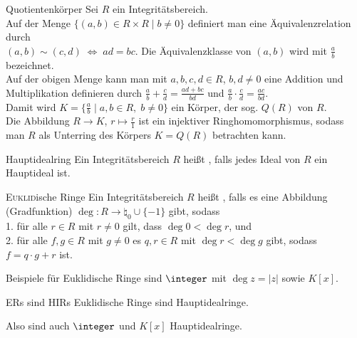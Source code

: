 \begin{Def}{Quotientenkörper}
    Sei $R$ ein Integritätsbereich. \\
    Auf der Menge $\{(a, b) \in R \times R \;|\; b \not= 0\}$ definiert
    man eine Äquivalenzrelation durch \\
    $(a, b) \sim (c, d) \;\Leftrightarrow\; ad = bc$.
    Die Äquivalenzklasse von $(a, b)$ wird mit $\frac{a}{b}$
    bezeichnet. \\
    Auf der obigen Menge kann man mit $a, b, c, d \in R$, $b, d \not= 0$
    eine Addition und Multiplikation definieren durch
    $\frac{a}{b} + \frac{c}{d} = \frac{ad + bc}{bd}$ und
    $\frac{a}{b} \cdot \frac{c}{d} = \frac{ac}{bd}$. \\
    Damit wird $K = \{\frac{a}{b} \;|\; a, b \in R,\; b \not= 0\}$ ein
    Körper, der sog.  $Q(R)$ von $R$. \\
    Die Abbildung $R \rightarrow K$, $r \mapsto \frac{r}{1}$ ist ein
    injektiver Ringhomomorphismus, sodass man $R$ als Unterring des Körpers
    $K = Q(R)$ betrachten kann.
\end{Def}

\begin{Def}{Hauptidealring}
    Ein Integritätsbereich $R$ heißt , falls
    jedes Ideal von $R$ ein Hauptideal ist.
\end{Def}

\begin{Def}{\textsc{Euklid}ische Ringe}
    Ein Integritätsbereich $R$ heißt ,
    falls es eine Abbildung (Gradfunktion)
    $\deg: R \rightarrow \natural_0 \cup \{-1\}$ gibt, sodass \\
    1. für alle $r \in R$ mit $r \not= 0$ gilt, dass $\deg 0 < \deg r$, und \\
    2. für alle $f, g \in R$ mit $g \not= 0$ es $q, r \in R$ mit
    $\deg r < \deg g$ gibt, sodass $f = q \cdot g + r$ ist.
\end{Def}

\begin{Bem}
    Beispiele für Euklidische Ringe sind $\integer$ mit $\deg z = |z|$
    sowie $K[x]$.
\end{Bem}

\begin{Satz}{ERs sind HIRs}
    Euklidische Ringe sind Hauptidealringe.
\end{Satz}

\begin{Kor}
    Also sind auch $\integer$ und $K[x]$ Hauptidealringe.
\end{Kor}


